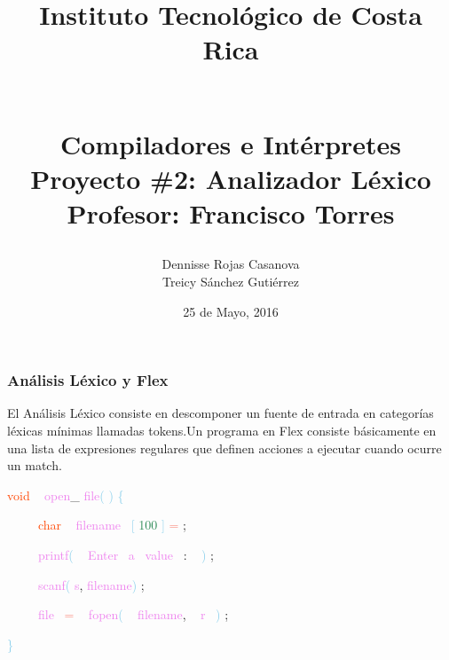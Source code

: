 \documentclass[8, usernames, dvipsnames]{beamer}
\begin{document}
 
\title{
\begin{LARGE}
Instituto Tecnol\'ogico de Costa Rica
\end{LARGE}
\newline
\begin{Large}
\\Compiladores e Int\'erpretes
\\Proyecto \#2: Analizador L\'exico
\\Profesor: Francisco Torres
\end{Large}
}
\author{Dennisse Rojas Casanova
\\Treicy S\'anchez Guti\'errez}
\date{25 de Mayo, 2016}
\maketitle 
\begin{frame} 
\frametitle{An\'alisis L\'exico y Flex} 
El An\'alisis L\'exico consiste en descomponer un fuente de entrada en categor\'ias l\'exicas m\'inimas llamadas tokens.Un programa en Flex consiste b\'asicamente en una lista de expresiones regulares que definen acciones a ejecutar cuando ocurre un match.\end{frame} 
\begin{frame}
\textcolor{OrangeRed}{void}
\textcolor{White}{\ }
\textcolor{Violet}{open}\textcolor{Sepia}{\_}
\textcolor{Violet}{file}\textcolor{SkyBlue}{(}
\textcolor{SkyBlue}{)}
\textcolor{SkyBlue}{\{ }

 \textcolor{White}{\ }
\textcolor{White}{\ }
\textcolor{White}{\ }
\textcolor{OrangeRed}{char}
\textcolor{White}{\ }
\textcolor{Violet}{filename}\textcolor{White}{\ }
\textcolor{SkyBlue}{[}
\textcolor{SeaGreen}{100}
\textcolor{SkyBlue}{]}
\textcolor{Salmon}{=}
\textcolor{Sepia}{;}

 \textcolor{White}{\ }
\textcolor{White}{\ }
\textcolor{White}{\ }
\textcolor{Violet}{printf}\textcolor{SkyBlue}{(}
\textcolor{White}{\ }
\textcolor{Violet}{Enter}\textcolor{White}{\ }
\textcolor{Violet}{a}\textcolor{White}{\ }
\textcolor{Violet}{value}\textcolor{White}{\ }
\textcolor{Sepia}{:}
\textcolor{White}{\ }
\textcolor{SkyBlue}{)}
\textcolor{Sepia}{;}

 \textcolor{White}{\ }
\textcolor{White}{\ }
\textcolor{White}{\ }
\textcolor{Violet}{scanf}\textcolor{SkyBlue}{(}
\textcolor{Violet}{s}\textcolor{Sepia}{,}
\textcolor{Violet}{filename}\textcolor{SkyBlue}{)}
\textcolor{Sepia}{;}

 \textcolor{White}{\ }
\textcolor{White}{\ }
\textcolor{White}{\ }
\textcolor{Violet}{file}\textcolor{White}{\ }
\textcolor{Salmon}{=}
\textcolor{White}{\ }
\textcolor{Violet}{fopen}\textcolor{SkyBlue}{(}
\textcolor{White}{\ }
\textcolor{Violet}{filename}\textcolor{Sepia}{,}
\textcolor{White}{\ }
\textcolor{Violet}{r}\textcolor{White}{\ }
\textcolor{SkyBlue}{)}
\textcolor{Sepia}{;}

 \textcolor{SkyBlue}{\} }

 \end{frame}
\end{document}
